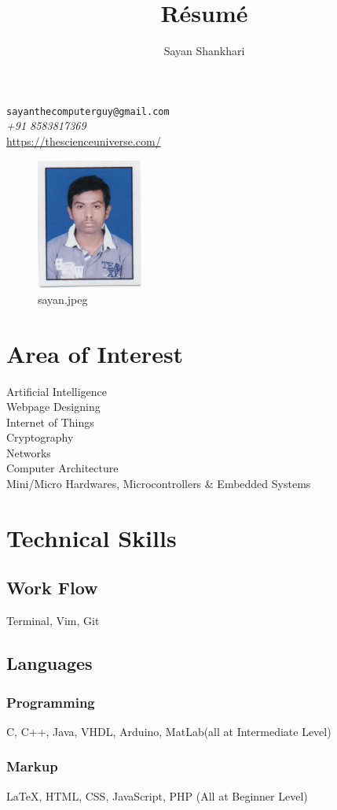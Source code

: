 \documentclass{article}
\makeatletter
\renewcommand{\maketitle}{
\begin{center}
{\huge\bfseries\theauthor}
\vspace{.25em}

\texttt{sayanthecomputerguy@gmail.com}\\
\textit{+91 8583817369}\\
\url{https://thescienceuniverse.com/}
\end{center}
}
\makeatother
\begin{document}
\title{R\'esum\'e}
\author{Sayan Shankhari}
\maketitle

\begin{figure}[h]
\begin{center}
\includegraphics[width=3.5cm]{Sayan.jpeg}
\caption{sayan.jpeg}
\end{center}
\end{figure}

\section{Area of Interest}
Artificial Intelligence\\
Webpage Designing\\
Internet of Things\\
Cryptography\\
Networks\\
Computer Architecture\\
Mini/Micro Hardwares, Microcontrollers \& Embedded Systems

\section{Technical Skills}

\subsection{Work Flow}
Terminal, Vim, Git

\subsection{Languages}
\subsubsection{Programming}
C, C++, Java, VHDL, Arduino, MatLab(all at Intermediate Level)
\subsubsection{Markup}
{\LaTeX}, HTML, CSS, JavaScript, PHP (All at Beginner Level)
\end{document}
